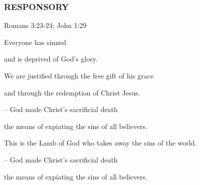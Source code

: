 \subsubsection{RESPONSORY}

\hfill Romans 3:23-24; John 1:29

Everyone has sinned\par
and is deprived of God’s glory.\par
We are justified through the free gift of his grace\par
and through the redemption of Christ Jesus.\par
– God made Christ’s sacrificial death\par
the means of expiating the sins of all believers.\par
\par
This is the Lamb of God who takes away the sins of the world.\par
– God made Christ’s sacrificial death\par
the means of expiating the sins of all believers.\par